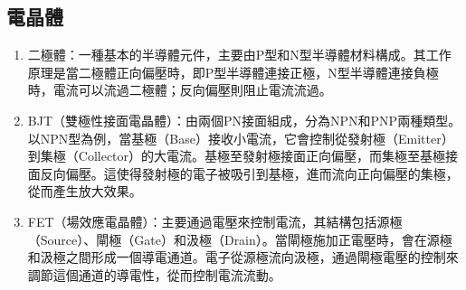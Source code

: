 \documentclass[12pt,a4paper]{article}
\begin{document}
\begin{CJK*}{UTF8}{bkai}
    \subsection{電晶體}
    \begin{enumerate}
        \item 二極體：一種基本的半導體元件，主要由P型和N型半導體材料構成。其工作原理是當二極體正向偏壓時，即P型半導體連接正極，N型半導體連接負極時，電流可以流過二極體；反向偏壓則阻止電流流過。
        \item BJT（雙極性接面電晶體）：由兩個PN接面組成，分為NPN和PNP兩種類型。以NPN型為例，當基極（Base）接收小電流，它會控制從發射極（Emitter）到集極（Collector）的大電流。基極至發射極接面正向偏壓，而集極至基極接面反向偏壓。這使得發射極的電子被吸引到基極，進而流向正向偏壓的集極，從而產生放大效果。
        \item FET（場效應電晶體）：主要通過電壓來控制電流，其結構包括源極（Source）、閘極（Gate）和汲極（Drain）。當閘極施加正電壓時，會在源極和汲極之間形成一個導電通道。電子從源極流向汲極，通過閘極電壓的控制來調節這個通道的導電性，從而控制電流流動。
    \end{enumerate}

    \newpage

\end{CJK*}
\end{document}
